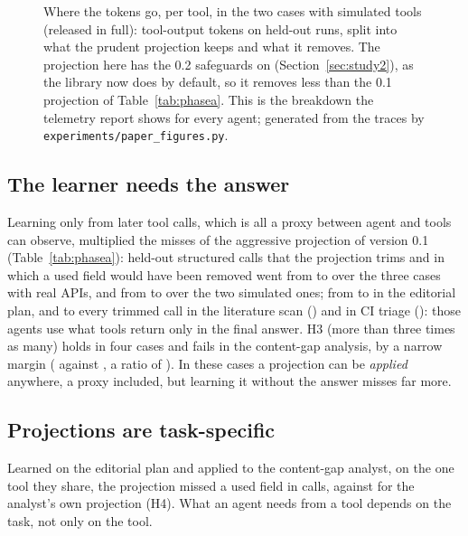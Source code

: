\begin{figure}[t]
\centering

\caption{Where the tokens go, per tool, in the two cases with simulated tools (released in full): tool-output
tokens on held-out runs, split into what the prudent projection keeps and what it removes. The projection here has
the 0.2 safeguards on (Section~\ref{sec:study2}), as the library now does by default, so it removes less than the 0.1
projection of Table~\ref{tab:phasea}. This is the breakdown the telemetry report shows for every agent; generated from
the traces by \texttt{experiments/paper\_figures.py}.}
\label{fig:tools}
\end{figure}

\subsection{The learner needs the answer}

Learning only from later tool calls, which is all a proxy between agent and tools can observe, multiplied the
misses of the aggressive projection of version 0.1 (Table~\ref{tab:phasea}): held-out structured calls that the
projection trims and in which a used field would have been removed went from \MissesPooledRealFull{} to
\MissesPooledRealCalls{} over the three cases with real APIs, and from \MissesPooledSimFull{} to \MissesPooledSimCalls{}
over the two simulated ones; from \PhaseAMissesi{} to \PhaseAMissesCallsi{} in the editorial plan,
and to every trimmed call in the literature scan (\PhaseAMissesCallsiii) and in CI triage (\PhaseAMissesCallsv):
those agents use what tools return only in the final answer. H3 (more than three times as many) holds in four cases
and fails in the content-gap analysis, by a narrow margin (\PhaseAMissesii{} against \PhaseAMissesCallsii, a ratio of
\HThreeRatioii). In these cases a projection can be \emph{applied} anywhere, a proxy included, but learning it
without the answer misses far more.

\subsection{Projections are task-specific}

Learned on the editorial plan and applied to the content-gap analyst, on the one tool they share, the projection
missed a used field in \TransferMisses{} calls, against \WithinMisses{} for the analyst's own projection (H4). What
an agent needs from a tool depends on the task, not only on the tool.

